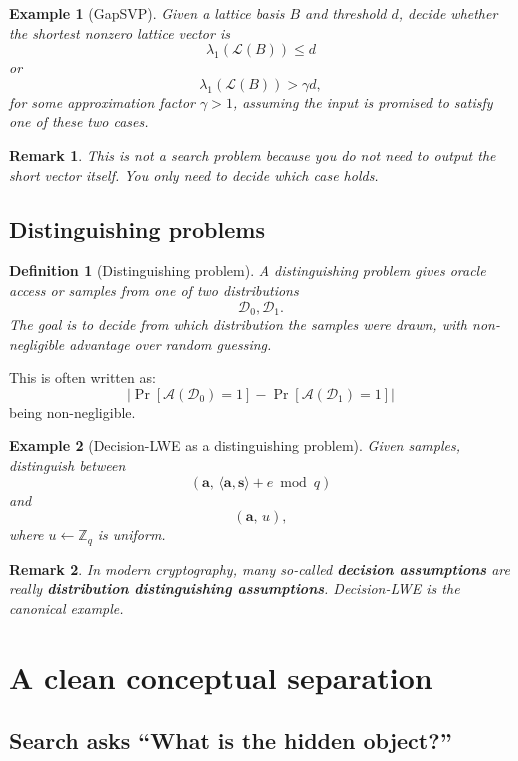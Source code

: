\documentclass[11pt]{article}
\newtheorem{definition}{Definition}
\newtheorem{remark}{Remark}
\newtheorem{example}{Example}
\begin{document}
	\begin{example}[GapSVP]
		Given a lattice basis $B$ and threshold $d$, decide whether the shortest nonzero lattice vector is
		\[
		\lambda_1(\mathcal{L}(B)) \le d
		\]
		or
		\[
		\lambda_1(\mathcal{L}(B)) > \gamma d,
		\]
		for some approximation factor $\gamma > 1$, assuming the input is promised to satisfy one of these two cases.
	\end{example}
	
	\begin{remark}
		This is not a search problem because you do \emph{not} need to output the short vector itself. You only need to decide which case holds.
	\end{remark}
	
	\subsection{Distinguishing problems}
	
	\begin{definition}[Distinguishing problem]
		A distinguishing problem gives oracle access or samples from one of two distributions
		\[
		\mathcal{D}_0,\mathcal{D}_1.
		\]
		The goal is to decide from which distribution the samples were drawn, with non-negligible advantage over random guessing.
	\end{definition}
	
	\noindent
	This is often written as:
	\[
	\left| \Pr[\mathcal{A}(\mathcal{D}_0)=1] - \Pr[\mathcal{A}(\mathcal{D}_1)=1] \right|
	\]
	being non-negligible.
	
	\begin{example}[Decision-LWE as a distinguishing problem]
		Given samples, distinguish between
		\[
		(\bm a,\, \langle \bm a,\bm s\rangle + e \bmod q)
		\]
		and
		\[
		(\bm a,\, u),
		\]
		where $u \leftarrow \mathbb{Z}_q$ is uniform.
	\end{example}
	
	\begin{remark}
		In modern cryptography, many so-called \textbf{decision assumptions} are really \textbf{distribution distinguishing assumptions}. Decision-LWE is the canonical example.
	\end{remark}
	
	\section{A clean conceptual separation}
	
	\subsection{Search asks ``What is the hidden object?''}
	
\end{document}

